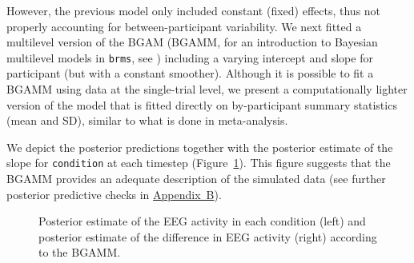 \documentclass[
  doc,
  floatsintext,
  longtable,
  a4paper,
  nolmodern,
  notxfonts,
  notimes,
  colorlinks=true,linkcolor=blue,citecolor=blue,urlcolor=blue]{apa7}
\begin{document}
However, the previous model only included constant (fixed) effects, thus
not properly accounting for between-participant variability. We next
fitted a multilevel version of the BGAM (BGAMM, for an introduction to
Bayesian multilevel models in \texttt{brms}, see
) including a
varying intercept and slope for participant (but with a constant
smoother). Although it is possible to fit a BGAMM using data at the
single-trial level, we present a computationally lighter version of the
model that is fitted directly on by-participant summary statistics (mean
and SD), similar to what is done in meta-analysis.

We depict the posterior predictions together with the posterior estimate
of the slope for \texttt{condition} at each timestep
(Figure~\ref{fig-plot-post-slope}). This figure suggests that the BGAMM
provides an adequate description of the simulated data (see further
posterior predictive checks in \hyperref[apx-basis]{Appendix~B}).

\begin{figure}[!htb]

\caption{\label{fig-plot-post-slope}Posterior estimate of the EEG
activity in each condition (left) and posterior estimate of the
difference in EEG activity (right) according to the BGAMM.}


\end{figure}%
\end{document}

